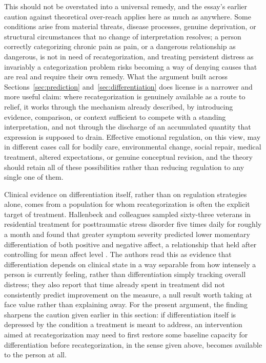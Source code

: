 \documentclass[11pt]{article}
\begin{document}
This should not be overstated into a universal remedy, and the essay's earlier caution against theoretical over-reach applies here as much as anywhere. Some conditions arise from material threats, disease processes, genuine deprivation, or structural circumstances that no change of interpretation resolves; a person correctly categorizing chronic pain as pain, or a dangerous relationship as dangerous, is not in need of recategorization, and treating persistent distress as invariably a categorization problem risks becoming a way of denying causes that are real and require their own remedy. What the argument built across Sections~\ref{sec:prediction} and~\ref{sec:differentiation} does license is a narrower and more useful claim: where recategorization is genuinely available as a route to relief, it works through the mechanism already described, by introducing evidence, comparison, or context sufficient to compete with a standing interpretation, and not through the discharge of an accumulated quantity that expression is supposed to drain. Effective emotional regulation, on this view, may in different cases call for bodily care, environmental change, social repair, medical treatment, altered expectations, or genuine conceptual revision, and the theory should retain all of these possibilities rather than reducing regulation to any single one of them.

Clinical evidence on differentiation itself, rather than on regulation strategies alone, comes from a population for whom recategorization is often the explicit target of treatment. Hallenbeck and colleagues sampled sixty-three veterans in residential treatment for posttraumatic stress disorder five times daily for roughly a month and found that greater symptom severity predicted lower momentary differentiation of both positive and negative affect, a relationship that held after controlling for mean affect level \citep{Hallenbeck2026}. The authors read this as evidence that differentiation depends on clinical state in a way separable from how intensely a person is currently feeling, rather than differentiation simply tracking overall distress; they also report that time already spent in treatment did not consistently predict improvement on the measure, a null result worth taking at face value rather than explaining away. For the present argument, the finding sharpens the caution given earlier in this section: if differentiation itself is depressed by the condition a treatment is meant to address, an intervention aimed at recategorization may need to first restore some baseline capacity for differentiation before recategorization, in the sense given above, becomes available to the person at all.
\end{document}
